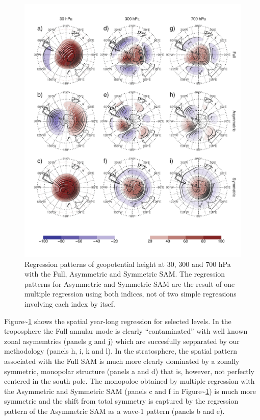 \documentclass[]{ametsocV5}
\begin{document}
\begin{figure}
\includegraphics{2d-regr-1} \caption[Regression patterns of geopotential height at 30, 300 and 700 hPa with the Full, Asymmetric and Symmetric SAM]{Regression patterns of geopotential height at 30, 300 and 700 hPa with the Full, Asymmetric and Symmetric SAM. The regression patterns for Asymmetric and Symmetric SAM are the result of one multiple regression using both indices, not of two simple regressions involving each index by itsef.}\label{fig:2d-regr}
\end{figure}

Figure\textasciitilde{}\ref{fig:2d-regr} shows the spatial year-long
regression for selected levels. In the troposphere the Full annular mode
is clearly ``contaminated'' with well known zonal asymemtries (panels g
and j) which are succesfully sepparated by our methodology (panels h, i,
k and l). In the stratosphere, the spatial pattern associated with the
Full SAM is much more clearly dominated by a zonally symmetric,
monopolar structure (panels a and d) that is, however, not perfectly
centered in the south pole. The monopoloe obtained by multiple
regression with the Asymmetric and Symmetric SAM (panels c and f in
Figure\textasciitilde{}\ref{fig:2d-regr}) is much more symmetric and the
shift from total symmetry is captured by the regression pattern of the
Asymmetric SAM as a wave-1 pattern (panels b and e).
\end{document}
